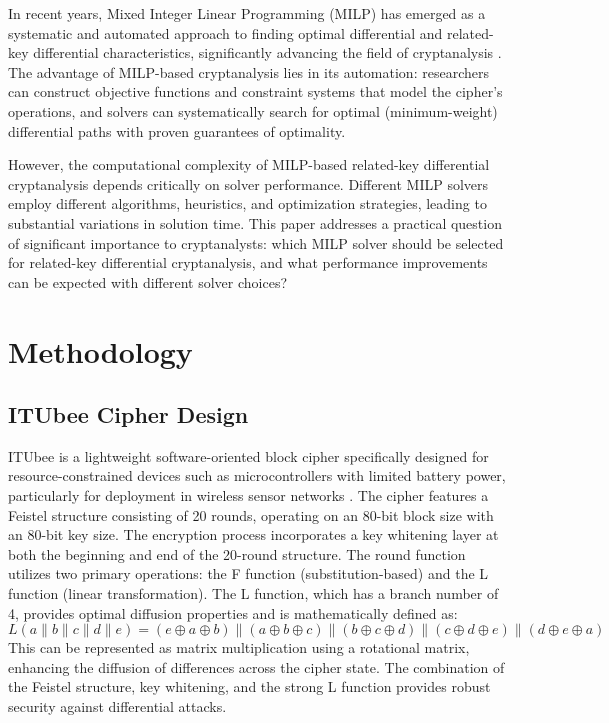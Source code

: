 \documentclass[11pt,a4paper]{article}
\begin{document}
In recent years, Mixed Integer Linear Programming (MILP) has emerged as a systematic and automated approach to finding optimal differential and related-key differential characteristics, significantly advancing the field of cryptanalysis \cite{mouha2012constraint}. The advantage of MILP-based cryptanalysis lies in its automation: researchers can construct objective functions and constraint systems that model the cipher's operations, and solvers can systematically search for optimal (minimum-weight) differential paths with proven guarantees of optimality.

However, the computational complexity of MILP-based related-key differential cryptanalysis depends critically on solver performance. Different MILP solvers employ different algorithms, heuristics, and optimization strategies, leading to substantial variations in solution time. This paper addresses a practical question of significant importance to cryptanalysts: which MILP solver should be selected for related-key differential cryptanalysis, and what performance improvements can be expected with different solver choices?

\section{Methodology}

\subsection{ITUbee Cipher Design}
ITUbee is a lightweight software-oriented block cipher specifically designed for resource-constrained devices such as microcontrollers with limited battery power, particularly for deployment in wireless sensor networks \cite{karakoc2013itubee}. The cipher features a Feistel structure consisting of 20 rounds, operating on an 80-bit block size with an 80-bit key size. The encryption process incorporates a key whitening layer at both the beginning and end of the 20-round structure. The round function utilizes two primary operations: the F function (substitution-based) and the L function (linear transformation). The L function, which has a branch number of 4, provides optimal diffusion properties and is mathematically defined as:
\begin{equation}
L(a \parallel b \parallel c \parallel d \parallel e) = (e \oplus a \oplus b) \parallel (a \oplus b \oplus c) \parallel (b \oplus c \oplus d) \parallel (c \oplus d \oplus e) \parallel (d \oplus e \oplus a)
\end{equation}
This can be represented as matrix multiplication using a rotational matrix, enhancing the diffusion of differences across the cipher state. The combination of the Feistel structure, key whitening, and the strong L function provides robust security against differential attacks.
\end{document}
